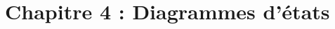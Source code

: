 \documentclass[../Syllabus.tex]{subfiles}
\begin{document}
\section{Chapitre 4 : Diagrammes d'états}
\end{document}

